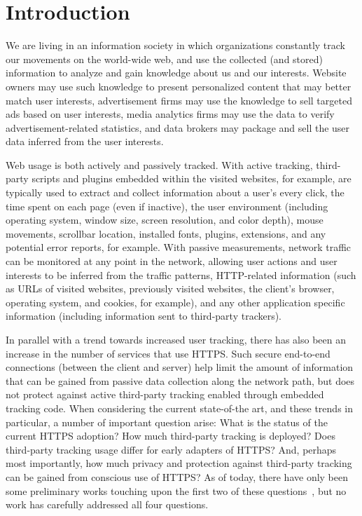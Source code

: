 \documentclass{sig-alternate-10pt}
\begin{document}
\section{Introduction}

We are living in an information society in which organizations constantly track our movements 
on the world-wide web, and use the collected (and stored) information to analyze and gain 
knowledge about us and our interests.  Website owners may use such knowledge to present personalized 
content that may better match user interests, advertisement firms may use the knowledge to sell 
targeted ads based on user interests, media analytics firms may use the data to verify 
advertisement-related statistics, and data brokers may package and sell the user data 
inferred from the user interests.

Web usage is both actively and passively tracked.  With active tracking, third-party 
scripts and plugins embedded within the visited websites, for example, are typically 
used to extract and collect information about a user's every click, the time spent on 
each page (even if inactive), the user environment (including operating system, window size, 
screen resolution, and color depth), mouse movements, scrollbar location, installed fonts, 
plugins, extensions, and any potential error reports, for example.  With passive measurements, 
network traffic can be monitored at any point in the network, allowing user actions and user 
interests to be inferred from the traffic patterns, HTTP-related information (such as URLs of 
visited websites, previously visited websites, the client's browser, operating system, and cookies, for example), 
and any other application specific information (including information sent to third-party trackers).

In parallel with a trend towards increased user tracking, there has also been an increase in the 
number of services that use HTTPS.  Such secure end-to-end connections (between the client and server) 
help limit the amount of information that can be gained from passive data collection along the network path, 
but does not protect against active third-party tracking enabled through embedded tracking code.  
When considering the current state-of-the art, and these trends in particular, 
a number of important question arise:  What is the status of the current HTTPS adoption?  
How much third-party tracking is deployed?  Does third-party tracking usage differ for early 
adapters of HTTPS? And, perhaps most importantly, how much privacy and protection against 
third-party tracking can be gained from conscious use of HTTPS?  As of today, there have 
only been some preliminary works touching upon the first two of these questions~\cite{BuMS11,NFL+14}, 
but no work has carefully addressed all four questions.
\end{document}
